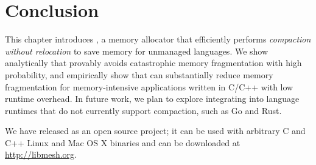 \section{Conclusion}
\label{sec:conclusion}

This chapter introduces \Mesh{}, a memory allocator that efficiently
performs \textit{compaction without relocation} to save memory for
unmanaged languages.  We show analytically that \Mesh{} provably
avoids catastrophic memory fragmentation with high probability, and
empirically show that \Mesh{} can substantially reduce memory
fragmentation for memory-intensive applications written in C/C++ with
low runtime overhead. In future work, we plan to
explore integrating \Mesh{} into language runtimes that do not
currently support compaction, such as Go and Rust.

We have released \Mesh as an open source
project; it can be used with arbitrary C and C++ Linux and Mac OS X
binaries and can be downloaded at
\url{http://libmesh.org}.
